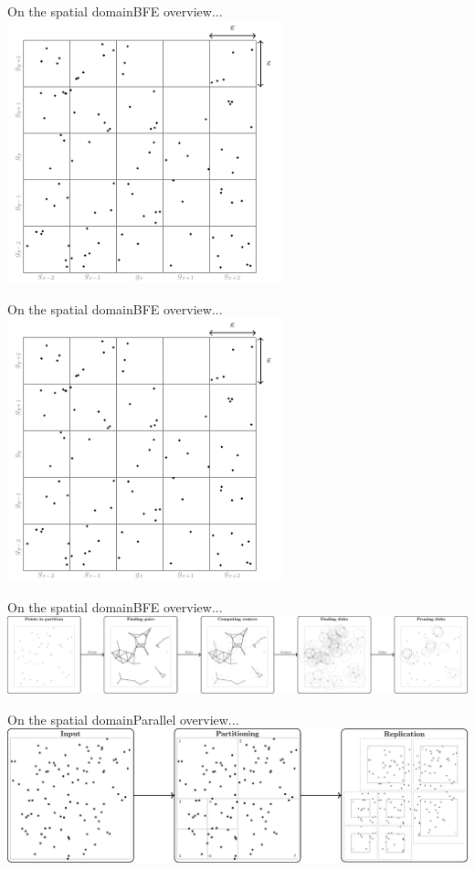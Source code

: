 \documentclass{beamer}
\begin{document}
\begin{frame}{On the spatial domain}{BFE overview...}
    \centering
    \includegraphics[page=3,width=0.6\textwidth]{figures/grid}
\end{frame}

\begin{frame}{On the spatial domain}{BFE overview...}
    \centering
    \includegraphics[page=4,width=0.6\textwidth]{figures/grid}
\end{frame}

\begin{frame}{On the spatial domain}{BFE overview...}
    \centering
    \includegraphics[width=\textwidth]{figures/MF_stages/flow}
\end{frame}

\begin{frame}{On the spatial domain}{Parallel overview...}
    \centering
    \includegraphics[width=\textwidth]{figures/MF_stages/P123}
\end{frame}
\end{document}
